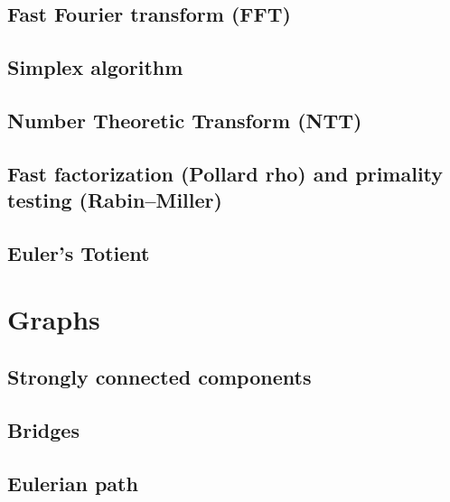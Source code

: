 \documentclass[9pt]{extarticle}
\begin{document}
\begin{multicols*}{3}
\subsection{Fast Fourier transform (FFT)} %


\subsection{Simplex algorithm} %


\subsection{Number Theoretic Transform (NTT)}


\subsection{Fast factorization (Pollard rho) and primality testing
(Rabin--Miller)} %


\subsection{Euler's Totient} %


\section{Graphs}

\subsection{Strongly connected components} %


\subsection{Bridges} %


\subsection{Eulerian path}



\end{multicols*}
\end{document}
